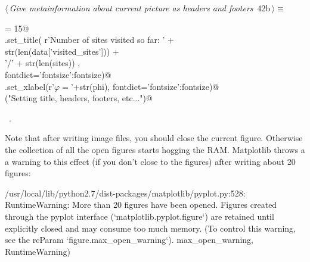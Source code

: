 \documentclass[11.5pt]{report}
\newenvironment{CVerbatim}
 {\singlespacing\center\BVerbatim}
 {\endBVerbatim\endcenter}
\begin{document}
\begin{flushleft} \small\label{scrap58}\raggedright\small
{} $\langle\,${\itshape Give metainformation about current picture as headers and footers}\nobreak\ {\footnotesize {42b}}$\,\rangle\equiv$
\vspace{-1ex}
\begin{list}{}{} \item
\mbox{}\verb@fontsize = 15@\\
\mbox{}\verb@ax.set_title( r'Number of sites visited so far: ' +\@\\
\mbox{}\verb@               str(len(data['visited_sites']))   +\@\\
\mbox{}\verb@               '/' + str(len(sites))           ,  \@\\
\mbox{}\verb@                    fontdict={'fontsize':fontsize})@\\
\mbox{}\verb@ax.set_xlabel(r'$\varphi=$'+str(phi), fontdict={'fontsize':fontsize})@\\
\mbox{}\verb@debug("Setting title, headers, footers, etc...")@\\
\mbox{}\verb@@{\NWsep}
\end{list}
\vspace{-1.5ex}
\footnotesize
\begin{list}{}{\setlength{\itemsep}{-\parsep}\setlength{\itemindent}{-\leftmargin}}
\item \NWtxtMacroRefIn\ .

\item{}
\end{list}
\vspace{4ex}
\end{flushleft}

\vspace{-0.8cm}
Note that after writing image files, you should close the current figure. Otherwise
the collection of all the open figures starts hogging the RAM. Matplotlib throws a
a warning to this effect (if you don't close to the figures) after writing about 
20 figures:

\begin{CVerbatim}[fontsize=\small]
/usr/local/lib/python2.7/dist-packages/matplotlib/pyplot.py:528: RuntimeWarning: 
More than 20 figures have been opened. Figures created through the pyplot interface 
(`matplotlib.pyplot.figure`) are retained until explicitly closed and may consume 
too much memory. (To control this warning, see the rcParam `figure.max_open_warning`).
max_open_warning, RuntimeWarning)
\end{CVerbatim}
\end{document}
